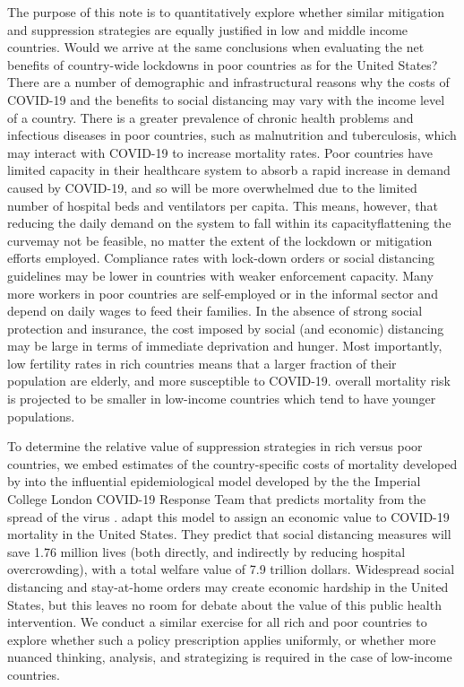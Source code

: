 \documentclass[11pt]{article}
\begin{document}
The purpose of this note is to quantitatively explore whether similar mitigation and suppression strategies are equally justified in low and middle income countries. Would we arrive at the same conclusions when evaluating the net benefits of country-wide lockdowns in poor countries as for the United States? There are a number of demographic and infrastructural reasons why the costs of COVID-19 and the benefits to social distancing may vary with the income level of a country.  There is a greater prevalence of chronic health problems and infectious diseases in poor countries, such as malnutrition and tuberculosis, which may interact with COVID-19 to increase mortality rates. Poor countries have limited capacity in their healthcare system to absorb a rapid increase in demand caused by COVID-19, and so will be more overwhelmed due to the limited number of hospital beds and ventilators per capita. This means, however, that reducing the daily demand on the system to fall within its capacity\textemdash flattening the curve\textemdash may not be feasible, no matter the extent of the lockdown or mitigation efforts employed. Compliance rates with lock-down orders or social distancing guidelines may be lower in countries with weaker enforcement capacity. Many more workers in poor countries are self-employed or in the informal sector and depend on daily wages to feed their families. In the absence of strong social protection and insurance, the cost imposed by social (and economic) distancing may be large in terms of immediate deprivation and hunger. Most importantly, low fertility rates in rich countries means that a larger fraction of their population are elderly, and more susceptible to COVID-19. overall mortality risk is projected to be smaller in low-income countries which tend to have younger populations.

To determine the relative value of suppression strategies in rich versus poor countries, we embed estimates of the country-specific costs of mortality developed by \textcite{viscusi2017} into the influential epidemiological model developed by the the Imperial College London COVID-19 Response Team that predicts mortality from the spread of the virus \parencite{ferguson2020}. \textcite{greenstone2020} adapt this model to assign an economic value to COVID-19 mortality in the United States. They predict that social distancing measures will save 1.76 million lives (both directly, and indirectly by reducing hospital overcrowding), with a total welfare value of 7.9 trillion dollars. Widespread social distancing and stay-at-home orders may create economic hardship in the United States, but this leaves no room for debate about the value of this public health intervention. We conduct a similar exercise for all rich and poor countries to explore whether such a policy prescription applies uniformly, or whether more nuanced thinking, analysis, and strategizing is required in the case of low-income countries.
\end{document}
